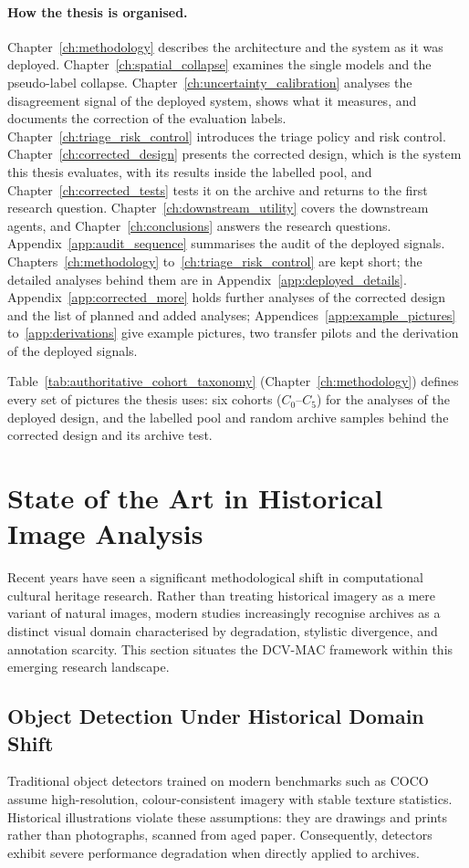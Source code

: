 \documentclass[12pt,a4paper]{report}
\begin{document}
\paragraph{How the thesis is organised.} Chapter~\ref{ch:methodology} describes the architecture and the system as it was deployed. Chapter~\ref{ch:spatial_collapse} examines the single models and the pseudo-label collapse. Chapter~\ref{ch:uncertainty_calibration} analyses the disagreement signal of the deployed system, shows what it measures, and documents the correction of the evaluation labels. Chapter~\ref{ch:triage_risk_control} introduces the triage policy and risk control. Chapter~\ref{ch:corrected_design} presents the corrected design, which is the system this thesis evaluates, with its results inside the labelled pool, and Chapter~\ref{ch:corrected_tests} tests it on the archive and returns to the first research question. Chapter~\ref{ch:downstream_utility} covers the downstream agents, and Chapter~\ref{ch:conclusions} answers the research questions. Appendix~\ref{app:audit_sequence} summarises the audit of the deployed signals. Chapters~\ref{ch:methodology} to~\ref{ch:triage_risk_control} are kept short; the detailed analyses behind them are in Appendix~\ref{app:deployed_details}. Appendix~\ref{app:corrected_more} holds further analyses of the corrected design and the list of planned and added analyses; Appendices~\ref{app:example_pictures} to~\ref{app:derivations} give example pictures, two transfer pilots and the derivation of the deployed signals.

Table~\ref{tab:authoritative_cohort_taxonomy} (Chapter~\ref{ch:methodology}) defines every set of pictures the thesis uses: six cohorts ($C_0$--$C_5$) for the analyses of the deployed design, and the labelled pool and random archive samples behind the corrected design and its archive test.

\section{State of the Art in Historical Image Analysis}
Recent years have seen a significant methodological shift in computational cultural heritage research. Rather than treating historical imagery as a mere variant of natural images, modern studies increasingly recognise archives as a distinct visual domain characterised by degradation, stylistic divergence, and annotation scarcity. This section situates the DCV-MAC framework within this emerging research landscape.

\subsection{Object Detection Under Historical Domain Shift}
Traditional object detectors trained on modern benchmarks such as COCO \cite{coco2014} assume high-resolution, colour-consistent imagery with stable texture statistics. Historical illustrations violate these assumptions: they are drawings and prints rather than photographs, scanned from aged paper. Consequently, detectors exhibit severe performance degradation when directly applied to archives.
\end{document}
